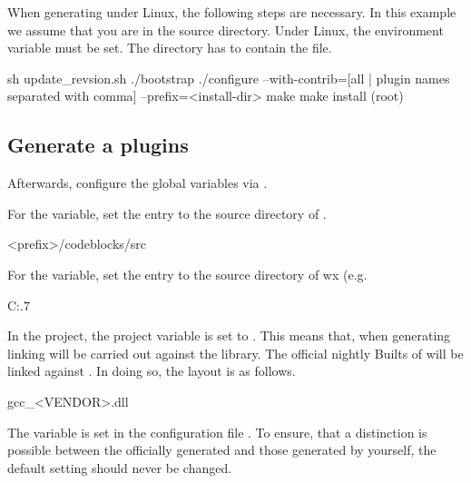 When generating under Linux, the following steps are necessary. In this example we assume that you are in the \codeblocks source directory.  Under Linux, the environment variable  must be set. The  directory has to contain the  file.



\begin{cmd}
sh update_revsion.sh
./bootstrap
./configure --with-contrib=[all | plugin names separated with comma] --prefix=<install-dir>
make
make install (root)
\end{cmd}

\subsection{Generate a plugins}

Afterwards, configure the global variables via .


For the  variable, set the  entry to the source directory of \codeblocks.

\begin{cmd}
<prefix>/codeblocks/src
\end{cmd}


For the  variable, set the  entry to the source directory of wx (e.g.

\begin{cmd}
C:\Programme{}.7
\end{cmd}

In the \codeblocks project, the project variable  is set to . This means that, when generating \codeblocks linking will be carried out against the  library. The official nightly Builts of \codeblocks will be linked against . In doing so, the layout is as follows.

\begin{code}
gcc_<VENDOR>.dll
\end{code}

The  variable is set in the configuration file . To ensure, that a distinction is possible between the officially generated \codeblocks and those generated by yourself, the default setting  should never be changed.

